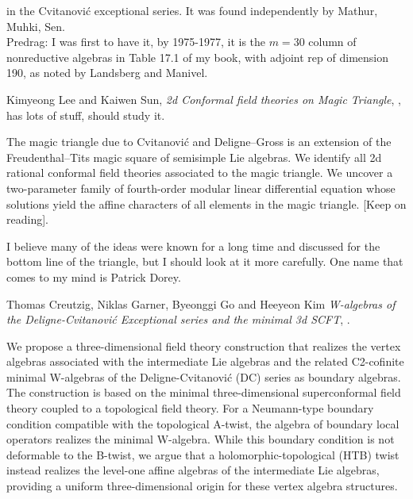 \begin{description}
[...] in the Cvitanovi{\'c} exceptional series. It was found independently
by Mathur, Muhki, Sen.
\\
Predrag:  I was first to have it, by 1975-1977, it is the $m=30$ column of
nonreductive algebras in Table 17.1 of my book, with adjoint rep of
dimension 190, as noted by Landsberg and Manivel.

\item[2026-05-11 Predrag]
Kimyeong Lee and Kaiwen Sun,
{\em 2d Conformal field theories on Magic Triangle},
,
has lots of stuff, should study it.

The magic triangle due to Cvitanovi\'c and Deligne--Gross is an extension of the
Freudenthal--Tits magic square of semisimple Lie algebras. We identify
all 2d rational conformal field theories associated to the magic triangle.
We uncover a
two-parameter family of fourth-order modular linear differential equation whose solutions
yield the affine characters of all elements in the magic triangle.
[Keep on reading].


\item[2026-05-11 Bernard Julia] 
I believe many of the ideas were known for a long time and discussed  
for the bottom line of the triangle, but I should look at it more carefully. 
One name that comes to my mind is 
{Patrick Dorey}.

\item[2026-03-18 Predrag]
Thomas Creutzig, Niklas Garner, Byeonggi Go and Heeyeon Kim
\emph{W-algebras of the Deligne-Cvitanovi{\'c} Exceptional series and the minimal 3d %
	SCFT},
.

We propose a three-dimensional field theory construction that realizes the vertex algebras associated with the intermediate Lie algebras and the related C2-cofinite minimal W-algebras of the Deligne-Cvitanovi{\'c} (DC) series as boundary algebras. The construction is based on the minimal three-dimensional %
 superconformal field theory coupled to a topological field theory. For a Neumann-type boundary condition compatible with the topological A-twist, the algebra of boundary local operators realizes the minimal W-algebra. %
 While this boundary condition is not deformable to the B-twist, we argue that a holomorphic-topological (HTB) twist instead realizes the level-one affine algebras of the intermediate Lie algebras, providing a uniform three-dimensional origin for these vertex algebra structures.


\end{description}
